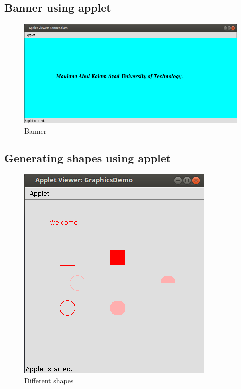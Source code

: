 \documentclass[a4paper,16pt]{article}
\begin{document}
	\subsection{Banner using applet}
	
	\begin{figure}[h!]
		\includegraphics[scale=0.6,width=\linewidth]{code/Banner/Banner.png}
		\caption{Banner}
	\end{figure}
	\newpage
	\subsection{Generating shapes using applet}
	
	\begin{figure}[h!]
		\centering
		\includegraphics[scale=0.4,width=0.7\linewidth]{code/shapes/shapes.png}
		\caption{Different shapes}
	\end{figure}
	\newpage
\end{document}
